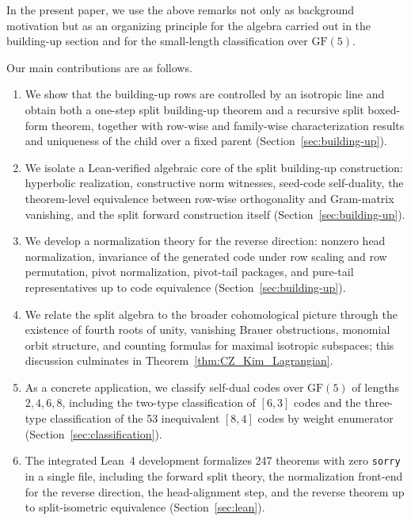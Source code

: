 \documentclass[12pt]{article}
\newcommand{\GF}[1]{\ensuremath{\mathrm{GF}(#1)}}
\begin{document}
In the present paper, we use the above remarks not only as background motivation but as an organizing principle for the algebra carried out in the building-up section and for the small-length classification over $\GF{5}$.

Our main contributions are as follows.
\begin{enumerate}[label=(\arabic*)]

\item We show that the building-up rows are controlled by an isotropic line and obtain both a one-step split building-up theorem and a recursive split boxed-form theorem, together with row-wise and family-wise characterization results and uniqueness of the child over a fixed parent (Section~\ref{sec:building-up}).

\item We isolate a Lean-verified algebraic core of the split building-up construction: hyperbolic realization, constructive norm witnesses, seed-code self-duality, the theorem-level equivalence between row-wise orthogonality and Gram-matrix vanishing, and the split forward construction itself (Section~\ref{sec:building-up}).

\item We develop a normalization theory for the reverse direction: nonzero head normalization, invariance of the generated code under row scaling and row permutation, pivot normalization, pivot-tail packages, and pure-tail representatives up to code equivalence (Section~\ref{sec:building-up}).

\item We relate the split algebra to the broader cohomological picture through the existence of fourth roots of unity, vanishing Brauer obstructions, monomial orbit structure, and counting formulas for maximal isotropic subspaces; this discussion culminates in Theorem~\ref{thm:CZ_Kim_Lagrangian}.

\item As a concrete application, we classify self-dual codes over $\GF{5}$ of lengths $2,4,6,8$, including the two-type classification of $[6,3]$ codes and the three-type classification of the 53 inequivalent $[8,4]$ codes by weight enumerator (Section~\ref{sec:classification}).

\item The integrated Lean~4 development formalizes 247 theorems with zero \texttt{sorry} in a single file, including the forward split theory, the normalization front-end for the reverse direction, the head-alignment step, and the reverse theorem up to split-isometric equivalence (Section~\ref{sec:lean}).
\end{enumerate}
\end{document}

